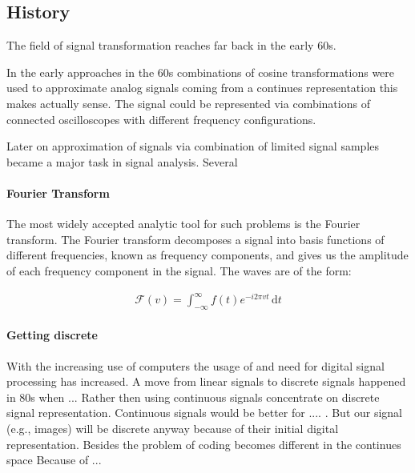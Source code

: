 

\subsection{History}
\label{sec:history}
The field of signal transformation reaches far back in the early 60s.
\cite{Rubinstein2010}

In the early approaches in the 60s combinations of cosine
transformations were used to approximate analog signals coming from a continues
representation this makes actually sense. The signal could be represented via
combinations of connected oscilloscopes with different frequency
configurations. 

Later on approximation of signals via combination of limited signal samples
became a major task in signal analysis. Several 

\paragraph{Fourier Transform}

The most widely accepted analytic tool for such problems is the Fourier
transform. The Fourier transform decomposes a signal into basis functions of
different frequencies, known as frequency components, and gives us the amplitude
of each frequency component in the signal. The waves are of the form:

\begin{align*}
 \mathcal{F}\left(v\right) = \int_{-\infty}^{\infty} \! f(t)e^{-i2\pi vt} \,
\mathrm{d}t
\end{align*}






\paragraph{Getting discrete}

With the increasing use of computers the usage of and need for digital signal
processing has increased.
A move from linear signals to discrete signals happened in 80s when ... 
Rather then using continuous signals concentrate on discrete
signal representation. Continuous signals would be better for .... .  But our
signal (e.g., images) will be discrete anyway because of their initial digital
representation. Besides the problem of coding becomes different in the continues
space \cite{} Because of ...

